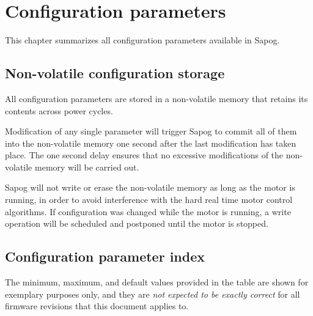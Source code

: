 \documentclass{zubaxdoc}
\newcommand{\CfgDef}[1]{
    \StrSubstitute{#1}{+}{\textunderscore}[\temp]
    \texttt{\temp}\label{#1}
}
\newcommand{\CfgListReferences}[1]{
    \renewcommand*{\do}[1]{\hyperlink{page.##1}{##1}\space}
    \dolistcsloop{#1}
}
\begin{document}
\chapter{Configuration parameters}

This chapter summarizes all configuration parameters available in Sapog.

\section{Non-volatile configuration storage}

All configuration parameters are stored in a non-volatile memory
that retains its contents across power cycles.

Modification of any single parameter will trigger Sapog to commit all of them into the non-volatile
memory one second after the last modification has taken place.
The one second delay ensures that no excessive modifications of the non-volatile memory will be carried out.

Sapog will not write or erase the non-volatile memory as long as the motor is running, in order to
avoid interference with the hard real time motor control algorithms.
If configuration was changed while the motor is running,
a write operation will be scheduled and postponed until the motor is stopped.

\section{Configuration parameter index}

The minimum, maximum, and default values provided in the table are shown for exemplary purposes only,
and they are \emph{not expected to be exactly correct} for all firmware revisions that this document applies to.

\newcommand\CfgParamIndexEntry[7]{%
    \CfgDef{#1} & \CfgListReferences{#1} & #2 & #3 &
    \footnotesize{#4} & \footnotesize{#5} & \footnotesize{#6} & #7 \tabularnewline
}%

\newenvironment{CfgParamIndex}[1]{%
    \begin{ZubaxTableWrapper}{#1}
    \begin{ZubaxWrappedTable}{|l l l|l|c c c|X|}
    Name  &  References  &  Unit  &  Eff. at  &  Min  &  Max  &  Def. & Note \\
}{%
    \end{ZubaxWrappedTable}
    \end{ZubaxTableWrapper}
}
\end{document}
